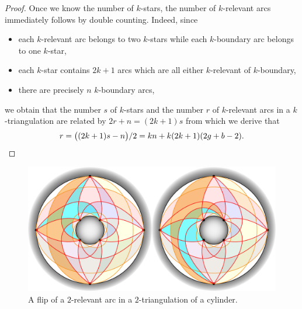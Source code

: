 \documentclass{amsart}
\theoremstyle{remark}
\newtheorem{remark}[theorem]{Remark}
\begin{document}
\begin{proof}
\medskip
Once we know the number of $k$-stars, the number of $k$-relevant arcs immediately follows by double counting.
Indeed, since
\begin{itemize}
\item each $k$-relevant arc belongs to two $k$-stars while each $k$-boundary arc belongs to one $k$-star,
\item each $k$-star contains $2k+1$ arcs which are all either $k$-relevant of $k$-boundary,
\item there are precisely $n$ $k$-boundary arcs,
\end{itemize}
we obtain that the number $s$ of $k$-stars and the number $r$ of $k$-relevant arcs in a $k$-triangulation are related by
\(
2r + n = (2k+1) s
\)
from which we derive that
\[
r = \big( (2k+1)s-n \big)/2 = kn + k(2k + 1)(2g + b - 2).
\qedhere
\]
\end{proof}

\begin{figure}[t]
	\capstart
	\centerline{\includegraphics[scale=.5]{2triangCylinderFlip}}
	\caption{A flip of a $2$-relevant arc in a $2$-triangulation of a cylinder.}
	\label{fig:flipSurface}
\end{figure}

\end{document}
